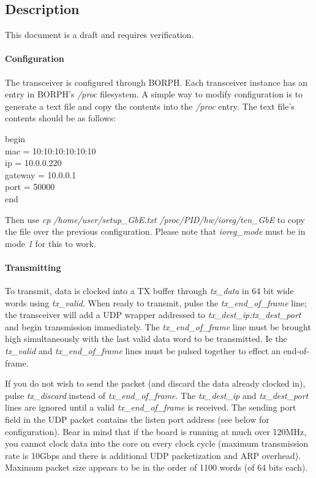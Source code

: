 \documentclass{article}
\newcommand{\BlockDesc}[1]{\subsection*{Description}#1}
\begin{document}
\BlockDesc{

This document is a draft and requires verification.

\paragraph{Configuration}
The transceiver is configured through BORPH. Each transceiver instance has an entry in BORPH's \textit{/proc} filesystem. A simple way to modify configuration is to generate a text file and copy the contents into the \textit{/proc} entry. The text file's contents should be as follows: \\
\begin{tabbing}

begin \=	\\
\>	mac = 10:10:10:10:10:10	\\
\>	ip = 10.0.0.220	\\
\>	gateway = 10.0.0.1	\\
\>	port = 50000	\\
end \\
\end{tabbing}


Then use \textit{cp /home/user/setup\_GbE.txt /proc/PID/hw/ioreg/ten\_GbE} to copy the file over the previous configuration. Please note that \textit{ioreg\_mode} must be in mode \textit{1} for this to work.

	
\paragraph{Transmitting}
To transmit, data is clocked into a TX buffer through \textit{tx\_data} in 64 bit wide words using \textit{tx\_valid}. When ready to transmit, pulse the \textit{tx\_end\_of\_frame} line; the transceiver will add a UDP wrapper addressed to \textit{tx\_dest\_ip:tx\_dest\_port} and begin transmission immediately. The \textit{tx\_end\_of\_frame} line must be brought high simultaneously with the last valid data word to be transmitted. Ie the \textit{tx\_valid} and \textit{tx\_end\_of\_frame} lines must be pulsed together to effect an end-of-frame.

If you do not wish to send the packet (and discard the data already clocked in), pulse \textit{tx\_discard} instead of \textit{tx\_end\_of\_frame}. The \textit{tx\_dest\_ip} and \textit{tx\_dest\_port} lines are ignored until a valid \textit{tx\_end\_of\_frame} is received.  The sending port field in the UDP packet contains the listen port address (see below for configuration). Bear in mind that if the board is running at much over 120MHz, you cannot clock data into the core on every clock cycle (maximum transmission rate is 10Gbps and there is additional UDP packetization and ARP overhead). Maximum packet size appears to be in the order of 1100 words (of 64 bits each).

}
\end{document}
